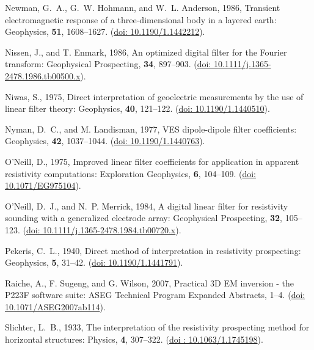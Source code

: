 \documentclass[a4paper, twoside, parskip, 10pt]{scrartcl}
\begin{document}
\begin{multicols}{2}
\begin{thebibliography}{}
Newman, G.~A., G.~W. Hohmann, and W.~L. Anderson,  1986, Transient
  electromagnetic response of a three-dimensional body in a layered earth:
  Geophysics, {\bf 51}, 1608--1627.
\newblock (\href{https://doi.org/10.1190/1.1442212}{doi: 10.1190/1.1442212}).

Nissen, J., and T. Enmark,  1986, An optimized digital filter for the {F}ourier
  transform: Geophysical Prospecting, {\bf 34}, 897--903.
\newblock (\href{https://doi.org/10.1111/j.1365-2478.1986.tb00500.x}{doi:
  10.1111/j.1365-2478.1986.tb00500.x}).

Niwas, S.,  1975, Direct interpretation of geoelectric measurements by the use
  of linear filter theory: Geophysics, {\bf 40}, 121--122.
\newblock (\href{https://doi.org/10.1190/1.1440510}{doi: 10.1190/1.1440510}).

Nyman, D.~C., and M. Landisman,  1977, {VES} dipole-dipole filter coefficients:
  Geophysics, {\bf 42}, 1037--1044.
\newblock (\href{https://doi.org/10.1190/1.1440763}{doi: 10.1190/1.1440763}).

O'Neill, D.,  1975, Improved linear filter coefficients for application in
  apparent resistivity computations: Exploration Geophysics, {\bf 6}, 104--109.
\newblock (\href{https://doi.org/10.1071/EG975104}{doi: 10.1071/EG975104}).

O'Neill, D.~J., and N.~P. Merrick,  1984, A digital linear filter for
  resistivity sounding with a generalized electrode array: Geophysical
  Prospecting, {\bf 32}, 105--123.
\newblock (\href{https://doi.org/10.1111/j.1365-2478.1984.tb00720.x}{doi:
  10.1111/j.1365-2478.1984.tb00720.x}).

Pekeris, C.~L.,  1940, Direct method of interpretation in resistivity
  prospecting: Geophysics, {\bf 5}, 31--42.
\newblock (\href{https://doi.org/10.1190/1.1441791}{doi: 10.1190/1.1441791}).

Raiche, A., F. Sugeng, and G. Wilson,  2007, Practical {3D} {EM} inversion -
  the {P223F} software suite: ASEG Technical Program Expanded Abstracts,  1--4.
\newblock (\href{https://doi.org/10.1071/ASEG2007ab114}{doi:
  10.1071/ASEG2007ab114}).

Slichter, L.~B.,  1933, The interpretation of the resistivity prospecting
  method for horizontal structures: Physics, {\bf 4}, 307--322.
\newblock (\href{https://doi.org/10.1063/1.1745198}{doi : 10.1063/1.1745198}).


\end{thebibliography}
\end{multicols}
\end{document}
